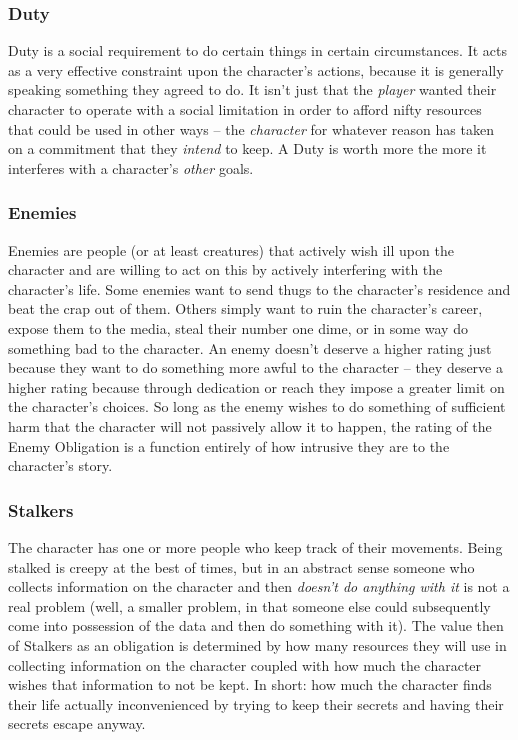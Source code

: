 \subsubsection{Duty}

\hspace{\parindent} Duty is a social requirement to do certain things in certain circumstances. It acts as a very effective constraint upon the character's actions, because it is generally speaking something they agreed to do. It isn't just that the \textit{player} wanted their character to operate with a social limitation in order to afford nifty resources that could be used in other ways -- the \textit{character} for whatever reason has taken on a commitment that they \textit{intend} to keep. A Duty is worth more the more it interferes with a character's \textit{other} goals.

\subsubsection{Enemies}

\hspace{\parindent} Enemies are people (or at least creatures) that actively wish ill upon the character and are willing to act on this by actively interfering with the character's life. Some enemies want to send thugs to the character's residence and beat the crap out of them. Others simply want to ruin the character's career, expose them to the media, steal their number one dime, or in some way do something bad to the character. An enemy doesn't deserve a higher rating just because they want to do something more awful to the character -- they deserve a higher rating because through dedication or reach they impose a greater limit on the character's choices. So long as the enemy wishes to do something of sufficient harm that the character will not passively allow it to happen, the rating of the Enemy Obligation is a function entirely of how intrusive they are to the character's story.

\subsubsection{Stalkers}

\hspace{\parindent} The character has one or more people who keep track of their movements. Being stalked is creepy at the best of times, but in an abstract sense someone who collects information on the character and then \textit{doesn't do anything with it} is not a real problem (well, a smaller problem, in that someone else could subsequently come into possession of the data and then do something with it). The value then of Stalkers as an obligation is determined by how many resources they will use in collecting information on the character coupled with how much the character wishes that information to not be kept. In short: how much the character finds their life actually inconvenienced by trying to keep their secrets and having their secrets escape anyway.

